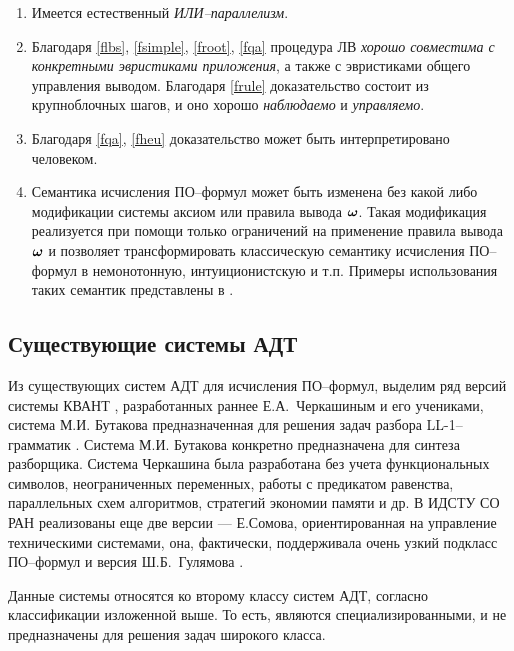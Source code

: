 \begin{enumerate}
%
\item Имеется естественный {\em ИЛИ--параллелизм}.
%
\item\label{fheu} Благодаря \ref{flbs}, \ref{fsimple}, \ref{froot}, \ref{fqa} процедура ЛВ {\em хорошо совместима с конкретными эвристиками приложения}, а также с эвристиками общего управления выводом. Благодаря \ref{frule} доказательство состоит из крупноблочных шагов, и оно хорошо {\em наблюдаемо} и {\em управляемо}.
%
\item Благодаря \ref{fqa}, \ref{fheu} доказательство может быть интерпретировано человеком.
%
\item Семантика исчисления ПО--формул может быть изменена без какой либо модификации системы аксиом или правила вывода $\boldsymbol{\omega}$. Такая модификация реализуется при помощи только ограничений на применение правила вывода $\boldsymbol{\omega}$ и позволяет трансформировать классическую семантику исчисления ПО--формул в немонотонную, интуиционистскую и т.п. Примеры использования таких семантик представлены в \cite{ICDS2000}.
\end{enumerate}

\subsection{Существующие системы АДТ}


Из существующих систем АДТ для исчисления ПО--формул, выделим ряд версий системы КВАНТ \cite{dissChe, Che2, QUANT4}, разработанных раннее Е.А.~Черкашиным и его учениками, система М.И. Бутакова предназначенная для решения задач разбора LL-1--грамматик \cite{Butakov1}. Система М.И. Бутакова конкретно предназначена для синтеза разборщика. Система Черкашина была разработана без учета функциональных символов, неограниченных переменных, работы с предикатом равенства, параллельных схем алгоритмов, стратегий экономии памяти и др. В ИДСТУ СО РАН реализованы еще две версии --- Е.Сомова, ориентированная на управление техническими системами, она, фактически, поддерживала очень узкий подкласс ПО--формул и версия Ш.Б.~Гулямова \cite{Gulamov}.

Данные системы относятся ко второму классу систем АДТ, согласно классификации изложенной выше. То есть, являются специализированными, и не предназначены для решения задач широкого класса.


